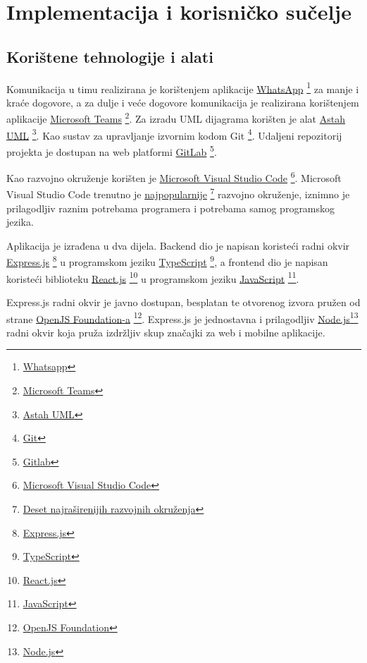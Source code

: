 \chapter{Implementacija i korisničko sučelje}
		
		\section{Korištene tehnologije i alati}
		
			Komunikacija u timu realizirana je korištenjem aplikacije \underline{WhatsApp} \footnote{\href{https://www.whatsapp.com/}{Whatsapp}} za manje i
			kraće dogovore, a za dulje i veće dogovore komunikacija je realizirana korištenjem aplikacije \underline{Microsoft Teams} \footnote{\href{https://www.microsoft.com/hr-hr/microsoft-365/microsoft-teams/group-chat-software}{Microsoft Teams}}. Za izradu UML dijagrama korišten je alat \underline{Astah UML} \footnote{\href{https://astah.net/products/astah-uml/}{Astah UML}}. Kao sustav za upravljanje izvornim kodom Git \footnote{\href{https://git-scm.com/}{Git}}. Udaljeni repozitorij projekta je dostupan na web platformi \underline{GitLab} \footnote{\href{https://www.gitlab.com}{Gitlab}}.

            Kao razvojno okruženje korišten je \underline{Microsoft Visual Studio Code} \footnote{\href{https://code.visualstudio.com/}{Microsoft Visual Studio Code}}. Microsoft Visual Studio Code trenutno je \underline{najpopularnije} \footnote{\href{https://pypl.github.io/IDE.html}{Deset najraširenijih razvojnih okruženja}} razvojno okruženje, iznimno je prilagodljiv raznim potrebama programera i potrebama samog programskog jezika.
            
            Aplikacija je izrađena u dva dijela. Backend dio je napisan koristeći radni okvir \underline{Express.js} \footnote{\href{https://expressjs.com/}{Express.js}} u programskom jeziku \underline{TypeScript} \footnote{\href{https://www.typescriptlang.org/}{TypeScript}}, a frontend dio je napisan koristeći biblioteku \underline{React.js} \footnote{\href{https://reactjs.org/}{React.js}} u programskom jeziku \underline{JavaScript} \footnote{\href{https://www.javascript.com/}{JavaScript}}.
            
            Express.js radni okvir je javno dostupan, besplatan te otvorenog izvora pružen od strane \underline{OpenJS Foundation-a} \footnote{\href{https://openjsf.org/}{OpenJS Foundation}}. Express.js je jednostavna i prilagodljiv \underline{Node.js}\footnote{\href{https://nodejs.org/en/}{Node.js}} radni okvir koja pruža izdržljiv skup značajki za web i mobilne aplikacije.
            
